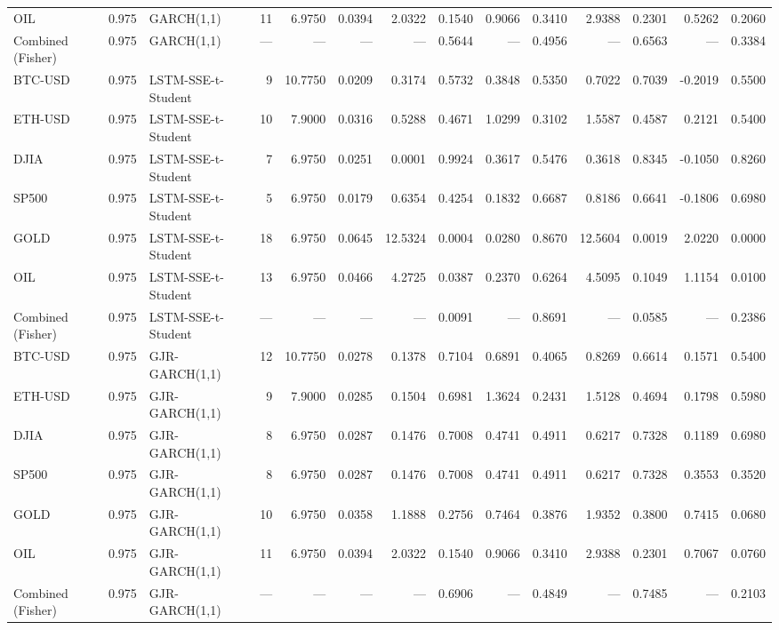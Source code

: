 \begin{table}[ht]
\begin{tabular}{lllrrrrrrrrrrr}
OIL & 0.975 & GARCH(1,1) & 11 & 6.9750 & 0.0394 & 2.0322 & 0.1540 & 0.9066 & 0.3410 & 2.9388 & 0.2301 & 0.5262 & 0.2060 \\
Combined (Fisher) & 0.975 & GARCH(1,1) & — & — & — & — & 0.5644 & — & 0.4956 & — & 0.6563 & — & 0.3384 \\
BTC-USD & 0.975 & LSTM-SSE-t-Student & 9 & 10.7750 & 0.0209 & 0.3174 & 0.5732 & 0.3848 & 0.5350 & 0.7022 & 0.7039 & -0.2019 & 0.5500 \\
ETH-USD & 0.975 & LSTM-SSE-t-Student & 10 & 7.9000 & 0.0316 & 0.5288 & 0.4671 & 1.0299 & 0.3102 & 1.5587 & 0.4587 & 0.2121 & 0.5400 \\
DJIA & 0.975 & LSTM-SSE-t-Student & 7 & 6.9750 & 0.0251 & 0.0001 & 0.9924 & 0.3617 & 0.5476 & 0.3618 & 0.8345 & -0.1050 & 0.8260 \\
SP500 & 0.975 & LSTM-SSE-t-Student & 5 & 6.9750 & 0.0179 & 0.6354 & 0.4254 & 0.1832 & 0.6687 & 0.8186 & 0.6641 & -0.1806 & 0.6980 \\
GOLD & 0.975 & LSTM-SSE-t-Student & 18 & 6.9750 & 0.0645 & 12.5324 & 0.0004 & 0.0280 & 0.8670 & 12.5604 & 0.0019 & 2.0220 & 0.0000 \\
OIL & 0.975 & LSTM-SSE-t-Student & 13 & 6.9750 & 0.0466 & 4.2725 & 0.0387 & 0.2370 & 0.6264 & 4.5095 & 0.1049 & 1.1154 & 0.0100 \\
Combined (Fisher) & 0.975 & LSTM-SSE-t-Student & — & — & — & — & 0.0091 & — & 0.8691 & — & 0.0585 & — & 0.2386 \\
BTC-USD & 0.975 & GJR-GARCH(1,1) & 12 & 10.7750 & 0.0278 & 0.1378 & 0.7104 & 0.6891 & 0.4065 & 0.8269 & 0.6614 & 0.1571 & 0.5400 \\
ETH-USD & 0.975 & GJR-GARCH(1,1) & 9 & 7.9000 & 0.0285 & 0.1504 & 0.6981 & 1.3624 & 0.2431 & 1.5128 & 0.4694 & 0.1798 & 0.5980 \\
DJIA & 0.975 & GJR-GARCH(1,1) & 8 & 6.9750 & 0.0287 & 0.1476 & 0.7008 & 0.4741 & 0.4911 & 0.6217 & 0.7328 & 0.1189 & 0.6980 \\
SP500 & 0.975 & GJR-GARCH(1,1) & 8 & 6.9750 & 0.0287 & 0.1476 & 0.7008 & 0.4741 & 0.4911 & 0.6217 & 0.7328 & 0.3553 & 0.3520 \\
GOLD & 0.975 & GJR-GARCH(1,1) & 10 & 6.9750 & 0.0358 & 1.1888 & 0.2756 & 0.7464 & 0.3876 & 1.9352 & 0.3800 & 0.7415 & 0.0680 \\
OIL & 0.975 & GJR-GARCH(1,1) & 11 & 6.9750 & 0.0394 & 2.0322 & 0.1540 & 0.9066 & 0.3410 & 2.9388 & 0.2301 & 0.7067 & 0.0760 \\
Combined (Fisher) & 0.975 & GJR-GARCH(1,1) & — & — & — & — & 0.6906 & — & 0.4849 & — & 0.7485 & — & 0.2103 \\

\end{tabular}
\end{table}
